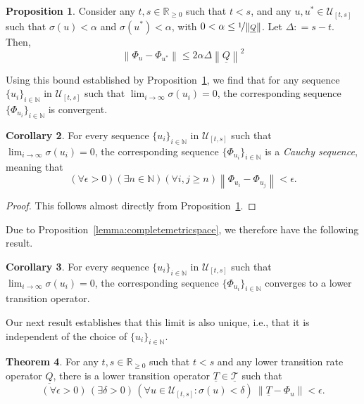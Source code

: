 \documentclass[10pt]{paper}
\theoremstyle{definition}
\newtheorem{theorem}{Theorem}
\newtheorem{proposition}[theorem]{Proposition}
\newtheorem{corollary}[theorem]{Corollary}
\newcommand{\nats}{\mathbb{N}}
\newcommand{\reals}{\mathbb{R}}
\newcommand{\realsnonneg}{\reals_{\geq 0}}
\newcommand{\lt}{\underline{T}}
\newcommand{\lrate}{\underline{Q}}
\newcommand{\norm}[1]{\left\lVert #1 \right\rVert}
\newcommand{\coloneqq}{:\!=}
\begin{document}
\begin{proposition}\label{prop:differencebetweenu}
Consider any $t,s\in\realsnonneg$ such that $t<s$, and any $u,u^*\in\mathcal{U}_{[t,s]}$ such that $\sigma(u)<\alpha$ and $\sigma(u^*)<\alpha$, with $0<\alpha\leq\nicefrac{1}{\norm{\lrate}}$. Let $\Delta\coloneqq s-t$. Then,
\begin{equation*}
\norm{\Phi_u-\Phi_{u^*}}\leq 2\alpha\Delta\norm{\lrate}^2
\end{equation*}
\end{proposition}

Using this bound established by Proposition~\ref{prop:differencebetweenu}, we find that for any sequence $\{u_i\}_{i\in\nats}$ in $\mathcal{U}_{[t,s]}$ such that $\lim_{i\to\infty}\sigma(u_i)=0$, the corresponding sequence $\{\Phi_{u_i}\}_{i\in\nats}$ is convergent.

\begin{corollary}\label{corol:cauchy}
For every sequence $\{u_i\}_{i\in\nats}$ in $\mathcal{U}_{[t,s]}$ such that $\lim_{i\to\infty}\sigma(u_i)=0$, the corresponding sequence $\{\Phi_{u_i}\}_{i\in\nats}$ is a \emph{Cauchy sequence}, meaning that
\begin{equation*}
(\forall \epsilon>0)(\exists n\in\nats)(\forall i,j\geq n)
\norm{\Phi_{u_i}-\Phi_{u_j}}<\epsilon.
\end{equation*}
\end{corollary}
\begin{proof}
This follows almost directly from Proposition~\ref{prop:differencebetweenu}.
\end{proof}

\noindent Due to Proposition~\ref{lemma:completemetricspace}, we therefore have the following result.

\begin{corollary}\label{corol:limitexistsandiscoherent}
For every sequence $\{u_i\}_{i\in\nats}$ in $\mathcal{U}_{[t,s]}$ such that $\lim_{i\to\infty}\sigma(u_i)=0$, the corresponding sequence $\{\Phi_{u_i}\}_{i\in\nats}$ converges to a lower transition operator.
\end{corollary}

Our next result establishes that this limit is also unique, i.e., that it is independent of the choice of $\{u_i\}_{i\in\nats}$.

\begin{theorem}\label{theo:convergencelowerbound}
For any $t,s\in\realsnonneg$ such that $t<s$ and any lower transition rate operator $\lrate$, there is a lower transition operator $\lt\in\underline{\mathcal{T}}$ such that 
\begin{equation*}
(\forall\epsilon>0)\,
(\exists\delta>0)\,
(\forall u\in\mathcal{U}_{[t,s]}\colon\sigma(u)<\delta)~\norm{\lt - \Phi_u}<\epsilon.
\end{equation*}
\end{theorem}
\end{document}
